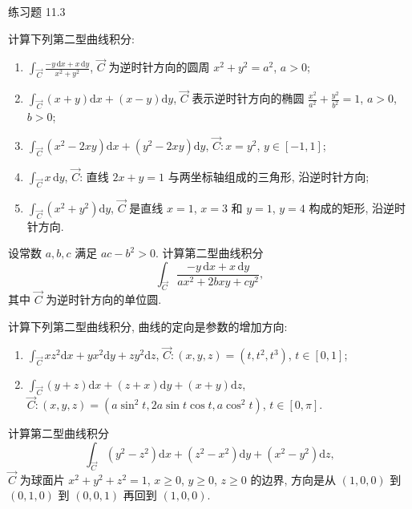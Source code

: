 \begin{exblock}{练习题 11.3}
\item 计算下列第二型曲线积分:
  \begin{enumerate}[label=(\arabic*),leftmargin=2.6em,itemsep=0.15\baselineskip,topsep=0.2\baselineskip]
  \item $\displaystyle\int_{\overrightarrow{C}}\frac{-y\,\mathrm{d}x+x\,\mathrm{d}y}{x^{2}+y^{2}}$, $\overrightarrow{C}$ 为逆时针方向的圆周 $x^{2}+y^{2}=a^{2}$, $a>0$;
  \item $\displaystyle\int_{\overrightarrow{C}}(x+y)\mathrm{d}x+(x-y)\mathrm{d}y$, $\overrightarrow{C}$ 表示逆时针方向的椭圆 $\frac{x^{2}}{a^{2}}+\frac{y^{2}}{b^{2}}=1$, $a>0$, $b>0$;
  \item $\displaystyle\int_{\overrightarrow{C}}(x^{2}-2xy)\mathrm{d}x+(y^{2}-2xy)\mathrm{d}y$, $\overrightarrow{C}:x=y^{2}$, $y\in[-1,1]$;
  \item $\displaystyle\int_{\overrightarrow{C}}x\,\mathrm{d}y$, $\overrightarrow{C}$: 直线 $2x+y=1$ 与两坐标轴组成的三角形, 沿逆时针方向;
  \item $\displaystyle\int_{\overrightarrow{C}}(x^{2}+y^{2})\mathrm{d}y$, $\overrightarrow{C}$ 是直线 $x=1$, $x=3$ 和 $y=1$, $y=4$ 构成的矩形, 沿逆时针方向.
  \end{enumerate}
\item 设常数 $a,b,c$ 满足 $ac-b^{2}>0$. 计算第二型曲线积分
  \[
  \int_{\overrightarrow{C}}\frac{-y\,\mathrm{d}x+x\,\mathrm{d}y}{ax^{2}+2bxy+cy^{2}},
  \]
  其中 $\overrightarrow{C}$ 为逆时针方向的单位圆.
\item 计算下列第二型曲线积分, 曲线的定向是参数的增加方向:
  \begin{enumerate}[label=(\arabic*),leftmargin=2.6em,itemsep=0.15\baselineskip,topsep=0.2\baselineskip]
  \item $\displaystyle\int_{\overrightarrow{C}}xz^{2}\mathrm{d}x+yx^{2}\mathrm{d}y+zy^{2}\mathrm{d}z$, $\overrightarrow{C}:(x,y,z)=(t,t^{2},t^{3})$, $t\in[0,1]$;
  \item $\displaystyle\int_{\overrightarrow{C}}(y+z)\mathrm{d}x+(z+x)\mathrm{d}y+(x+y)\mathrm{d}z$, $\overrightarrow{C}:(x,y,z)=(a\sin^{2}t,2a\sin t\cos t,a\cos^{2}t)$, $t\in[0,\pi]$.
  \end{enumerate}
\item 计算第二型曲线积分
  \[
  \int_{\overrightarrow{C}}(y^{2}-z^{2})\mathrm{d}x+(z^{2}-x^{2})\mathrm{d}y+(x^{2}-y^{2})\mathrm{d}z,
  \]
  $\overrightarrow{C}$ 为球面片 $x^{2}+y^{2}+z^{2}=1$, $x\geqslant0$, $y\geqslant0$, $z\geqslant0$ 的边界, 方向是从 $(1,0,0)$ 到 $(0,1,0)$ 到 $(0,0,1)$ 再回到 $(1,0,0)$.

\end{exblock}
